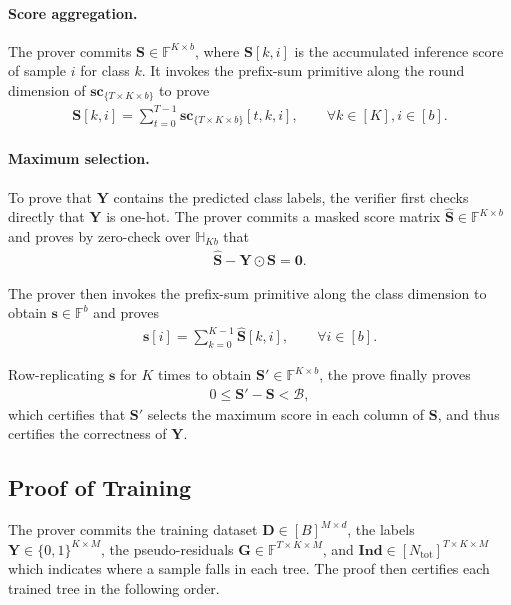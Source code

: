 \paragraph{Score aggregation.}
The prover commits
$\mathbf{S}\in\mathbb{F}^{K\times b}$, where
$\mathbf{S}[k,i]$ is the accumulated inference score of sample
$i$ for class $k$.
It invokes the prefix-sum primitive along the round dimension of
$\mathbf{sc}_{\{T\times K\times b\}}$ to prove
\begin{align}
    \mathbf{S}[k,i]
    =
    \sum_{t=0}^{T-1}
    \mathbf{sc}_{\{T\times K\times b\}}[t,k,i],
    \qquad
    \forall k\in[K], i\in[b].
\end{align}

\paragraph{Maximum selection.}
To prove that $\mathbf{Y}$ contains the predicted class labels, the verifier
first checks directly that $\mathbf{Y}$ is one-hot.
The prover commits a masked score matrix
$\widehat{\mathbf{S}}\in\mathbb{F}^{K\times b}$ and proves by zero-check
over $\mathbb{H}_{Kb}$ that
\begin{align}
    \widehat{\mathbf{S}}
    -
    \mathbf{Y}\odot\mathbf{S}
    =
    \mathbf{0}.
\end{align}

The prover then invokes the prefix-sum primitive along the class dimension to
obtain $\mathbf{s}\in\mathbb{F}^{b}$ and proves
\begin{align}
    \mathbf{s}[i]
    =
    \sum_{k=0}^{K-1}\widehat{\mathbf{S}}[k,i],
    \qquad
    \forall i\in[b].
\end{align}

Row-replicating $\mathbf{s}$ for $K$ times 
    to obtain $\mathbf{S}'\in \mathbb{F}^{K\times b}$, the prove finally proves
    \begin{align}
        0\leq \mathbf{S}' - \mathbf{S} < \mathcal{B},
    \end{align}
    which certifies that $\mathbf{S}'$ selects the maximum score in each column of $\mathbf{S}$, and thus certifies the correctness of $\mathbf{Y}$.

\subsection{Proof of Training}

The prover commits the training dataset
$\mathbf{D}\in[B]^{M\times d}$, the labels
$\mathbf{Y}\in\{0,1\}^{K\times M}$, the pseudo-residuals
$\mathbf{G}\in\mathbb{F}^{T\times K\times M}$, and
$\mathbf{Ind}\in[N_{\mathrm{tot}}]^{T\times K\times M}$
which indicates where a sample falls in each tree.
The proof then certifies each trained tree in the following order.

